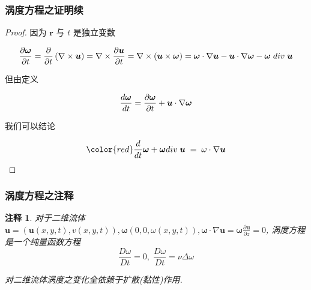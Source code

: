 \documentclass[aspectratio=2516]{beamer}
\newtheorem{rmk}{\kaishu 注释}
\begin{document}
\begin{frame}
\frametitle{\kaishu 涡度方程之证明续}

\kaishu

\tiny 

\begin{proof}
	
	\kaishu 
	
	\tiny 
	
	因为 $ \boldsymbol{r} $ 与 $ t $ 是独立变数
	
	\begin{equation}
	\frac{{\partial \boldsymbol{\omega} }}{{\partial t}} = \frac{\partial }{{\partial t}}\left( {\nabla  \times \boldsymbol{u}} \right) = \nabla  \times \frac{{\partial \boldsymbol{u}}}{{\partial t}} = \nabla  \times \left( {\boldsymbol{u} \times \boldsymbol{\omega} } \right) = \boldsymbol{\omega}  \cdot \nabla \boldsymbol{u} - \boldsymbol{u} \cdot \nabla \boldsymbol{\omega}  - \boldsymbol{\omega} \;div\;\boldsymbol{u}
	\notag 
	\end{equation}
	
	但由定义
	
	\begin{equation}
	\frac{{d\boldsymbol{\omega} }}{{dt}} = \frac{{\partial \boldsymbol{\omega} }}{{\partial t}} + \boldsymbol{u} \cdot \nabla \boldsymbol{\omega} 
	\notag 
	\end{equation}
	
	我们可以结论
	
	\begin{equation}
	\color{red}
	\frac{d}{{dt}}\boldsymbol{\omega}  + \boldsymbol{\omega} div\;\boldsymbol{u}\; = \;\omega  \cdot \nabla \boldsymbol{u}
	\notag 
	\end{equation}
\end{proof}

\end{frame}


\begin{frame}
\frametitle{\kaishu 涡度方程之注释}

\kaishu


\begin{rmk}
	
	\kaishu
	
	
	对于二维流体 $\boldsymbol{u} = \left( {\boldsymbol{u}\left( {x,y,t} \right),v\left( {x,y,t} \right)} \right),\boldsymbol{\omega} \left( {0,0,\omega \left( {x,y,t} \right)} \right),\boldsymbol{\omega}  \cdot \nabla \boldsymbol{u} = \boldsymbol{\omega} \frac{{\partial \boldsymbol{u}}}{{\partial z}} = 0$, 涡度方程是一个纯量函数方程
	\begin{equation}
	\frac{{D\omega }}{{Dt}} = 0,\;\frac{{D\omega }}{{Dt}} = \nu \Delta \omega 
	\label{eq5.3.10}
	\end{equation}
	
	对二维流体涡度之变化全依赖于扩散(黏性)作用.
	
\end{rmk}

\end{frame}
\end{document}
